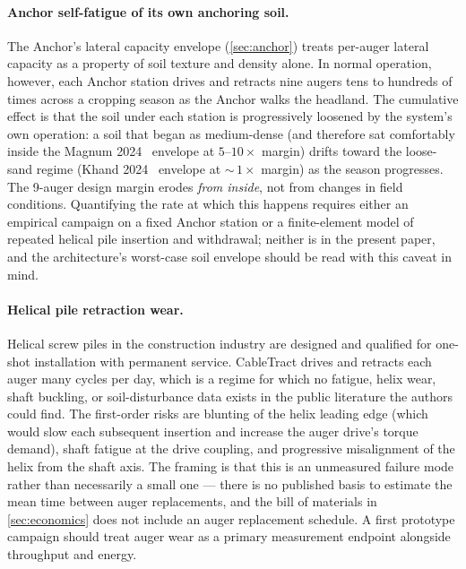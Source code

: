 \documentclass[11pt,a4paper]{article}
\begin{document}
\paragraph{Anchor self-fatigue of its own anchoring soil.} The Anchor's lateral capacity envelope (\cref{sec:anchor}) treats per-auger lateral capacity as a property of soil texture and density alone. In normal operation, however, each Anchor station drives and retracts nine augers tens to hundreds of times across a cropping season as the Anchor walks the headland. The cumulative effect is that the soil under each station is progressively loosened by the system's own operation: a soil that began as medium-dense (and therefore sat comfortably inside the Magnum 2024~\cite{magnum2024fixed} envelope at $5$--$10\times$ margin) drifts toward the loose-sand regime (Khand 2024~\cite{khand2024helical} envelope at ${\sim}\,1\times$ margin) as the season progresses. The 9-auger design margin erodes \emph{from inside}, not from changes in field conditions. Quantifying the rate at which this happens requires either an empirical campaign on a fixed Anchor station or a finite-element model of repeated helical pile insertion and withdrawal; neither is in the present paper, and the architecture's worst-case soil envelope should be read with this caveat in mind.

\paragraph{Helical pile retraction wear.} Helical screw piles in the construction industry are designed and qualified for one-shot installation with permanent service. CableTract drives and retracts each auger many cycles per day, which is a regime for which no fatigue, helix wear, shaft buckling, or soil-disturbance data exists in the public literature the authors could find. The first-order risks are blunting of the helix leading edge (which would slow each subsequent insertion and increase the auger drive's torque demand), shaft fatigue at the drive coupling, and progressive misalignment of the helix from the shaft axis. The framing is that this is an unmeasured failure mode rather than necessarily a small one --- there is no published basis to estimate the mean time between auger replacements, and the bill of materials in \cref{sec:economics} does not include an auger replacement schedule. A first prototype campaign should treat auger wear as a primary measurement endpoint alongside throughput and energy.
\end{document}
